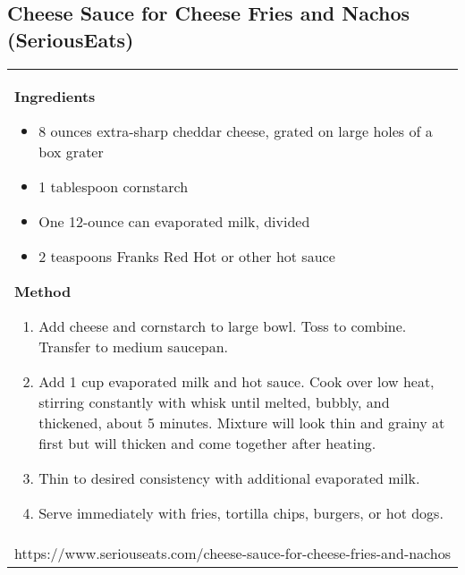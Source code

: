 \documentclass[web-recipes.tex]{subfiles}
\begin{document}
\renewcommand{\mytitle}{Cheese Sauce for Cheese Fries and Nachos (SeriousEats)}
\renewcommand{\myurl}{https://www.seriouseats.com/cheese-sauce-for-cheese-fries-and-nachos}
    \begin{mdframed}[nobreak]
      \section{\mytitle}
      \begin{tabular}{l}
        \begin{minipage}[t]{0.35\textwidth}
          {\sffamily\bfseries Ingredients}\vspace{0.5ex}
              \begin{itemize}
                \item 8 ounces extra-sharp cheddar cheese, grated on large holes of a box grater
                \item 1 tablespoon cornstarch
                \item One 12-ounce can evaporated milk, divided
                \item 2 teaspoons Franks Red Hot or other hot sauce
              \end{itemize}
        \end{minipage}
        \qquad
        \begin{minipage}[t]{0.55\textwidth}
          {\sffamily\bfseries Method}\vspace{0.5ex}
          \begin{enumerate}
            \item Add cheese and cornstarch to large bowl. Toss to combine.
              Transfer to medium saucepan.
            \item Add 1 cup evaporated milk and hot sauce. Cook over low heat,
              stirring constantly with whisk until melted, bubbly, and
              thickened, about 5 minutes. Mixture will look thin and grainy at
              first but will thicken and come together after heating.
            \item Thin to desired consistency with additional evaporated milk.
            \item Serve immediately with fries, tortilla chips, burgers, or hot
              dogs.
          \end{enumerate}
        \end{minipage} \vspace{3ex}\\
        \multicolumn{1}{c}{\small\ttfamily \myurl} \\
      \end{tabular}
    \end{mdframed}
    
\end{document}
